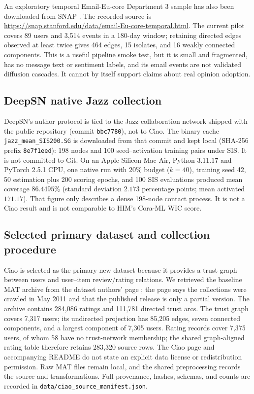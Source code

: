 \documentclass[10pt,twocolumn]{article}
\begin{document}
An exploratory temporal Email-Eu-core Department 3 sample has also been downloaded from SNAP \cite{snapemail}. The recorded source is \url{https://snap.stanford.edu/data/email-Eu-core-temporal.html}. The current pilot covers 89 users and 3,514 events in a 180-day window; retaining directed edges observed at least twice gives 464 edges, 15 isolates, and 16 weakly connected components. This is a useful pipeline smoke test, but it is small and fragmented, has no message text or sentiment labels, and its email events are not validated diffusion cascades. It cannot by itself support claims about real opinion adoption.

\subsection{DeepSN native Jazz collection}
DeepSN's author protocol is tied to the Jazz collaboration network shipped with the public repository (commit \texttt{bbc7780}), not to Ciao. The binary cache \texttt{jazz\_mean\_SIS200.SG} is downloaded from that commit and kept local (SHA-256 prefix \texttt{8e7f1eed}): 198 nodes and 100 seed--activation training pairs under SIS. It is not committed to Git. On an Apple Silicon Mac Air, Python 3.11.17 and PyTorch 2.5.1 CPU, one native run with 20\% budget ($k=40$), training seed 42, 50 estimation plus 200 scoring epochs, and 100 SIS evaluations produced mean coverage $86.4495\%$ (standard deviation $2.173$ percentage points; mean activated $171.17$). That figure only describes a dense 198-node contact process. It is not a Ciao result and is not comparable to HIM's Cora-ML WIC score.

\subsection{Selected primary dataset and collection procedure}
Ciao is selected as the primary new dataset because it provides a trust graph between users and user--item review/rating relations. We retrieved the baseline MAT archive from the dataset authors' page \cite{ciao}; the page says the collections were crawled in May 2011 and that the published release is only a partial version. The archive contains 284,086 ratings and 111,781 directed trust arcs. The trust graph covers 7,317 users; its undirected projection has 85,205 edges, seven connected components, and a largest component of 7,305 users. Rating records cover 7,375 users, of whom 58 have no trust-network membership; the shared graph-aligned rating table therefore retains 283,320 source rows. The Ciao page and accompanying README do not state an explicit data license or redistribution permission. Raw MAT files remain local, and the shared preprocessing records the source and transformations. Full provenance, hashes, schemas, and counts are recorded in \texttt{data/ciao\_source\_manifest.json}.
\end{document}
